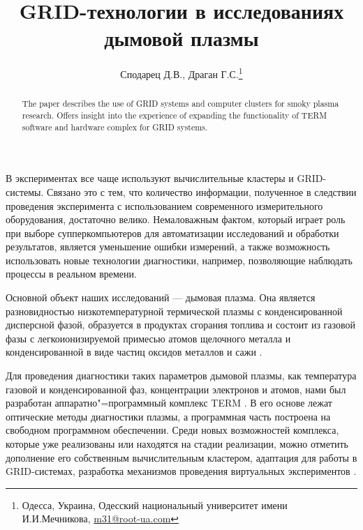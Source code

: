 \documentclass[10pt, a5paper]{article}
\begin{document}
\title{GRID-технологии в исследованиях дымовой плазмы}
\author{Сподарец Д.В., Драган Г.С.\footnote{Одесса, Украина, Одесский национальный университет имени И.И.Мечникова, \url{m31@root-ua.com}}}
\date{}
\maketitle
\begin{abstract}
The paper describes the use of GRID systems and computer clusters for smoky plasma research. Offers insight into the experience of expanding the functionality of TERM software and hardware complex for GRID systems.
\end{abstract}
В экспериментах все чаще используют  вычислительные кластеры и GRID-системы. Связано это с тем, что количество информации, полученное в следствии проведения эксперимента с использованием современного измерительного оборудования, достаточно велико. Немаловажным фактом, который играет роль при выборе супперкомпьютеров для автоматизации исследований и обработки результатов, является уменьшение ошибки измерений, а также возможность использовать новые технологии диагностики, например, позволяющие наблюдать процессы в реальном времени.

Основной объект наших исследований --- дымовая плазма. Она является разновидностью низкотемпературной термической плазмы с конденсированной дисперсной фазой, образуется в продуктах сгорания топлива и состоит из газовой фазы с легкоионизируемой примесью атомов щелочного металла и конденсированной в виде частиц оксидов металлов и сажи \cite{spod1}.

Для проведения диагностики таких параметров дымовой плазмы, как температура газовой и конденсированной фаз, концентрации электронов и атомов, нами был разработан аппаратно"=программный комплекс TERM \cite{spod2}. В его основе лежат оптические методы диагностики плазмы, а программная часть построена на свободном программном обеспечении. Среди новых возможностей комплекса, которые уже реализованы или находятся на стадии реализации, можно отметить дополнение его собственным вычислительным кластером, адаптация для работы в GRID-системах, разработка механизмов проведения виртуальных экспериментов \cite{spod3}.
\end{document}
